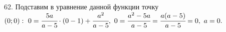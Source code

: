 62. Подставим в уравнение данной функции точку $(0;0):\ 0=\cfrac{5a}{a-5}\cdot(0-1)+\cfrac{a^2}{a-5},\ 0=\cfrac{a^2-5a}{a-5}=\cfrac{a(a-5)}{a-5}=0,\ a=0.$\\
